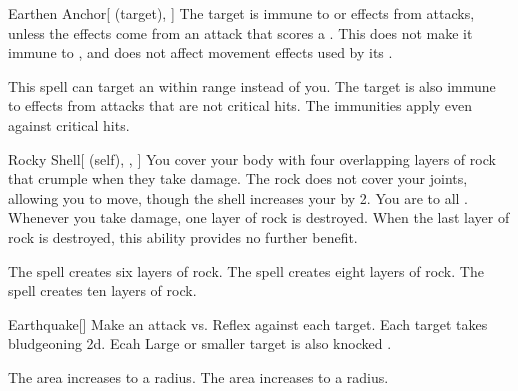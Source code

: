 \lowercase{\hypertarget{spell:Earthen Anchor}{}}\label{spell:Earthen Anchor}
\begin{attuneability}[Rank 2]{\hypertarget{spell:Earthen Anchor}{Earthen Anchor}}[ (target), ]
The target is immune to  or  effects from attacks, unless the effects come from an attack that scores a .
This does not make it immune to , and does not affect movement effects used by its .

\rankline
{} This spell can target an  within \rngmed range instead of you.
 The target is also immune to  effects from attacks that are not critical hits.
 The immunities apply even against critical hits.

\end{attuneability}
\vspace{0.25em}



\lowercase{\hypertarget{spell:Rocky Shell}{}}\label{spell:Rocky Shell}
\begin{attuneability}[Rank 2]{\hypertarget{spell:Rocky Shell}{Rocky Shell}}[ (self), , ]
You cover your body with four overlapping layers of rock that crumple when they take damage.
The rock does not cover your joints, allowing you to move, though the shell increases your  by 2.
You are  to all .
Whenever you take damage, one layer of rock is destroyed.
When the last layer of rock is destroyed, this ability provides no further benefit.

\rankline
{} The spell creates six layers of rock.
 The spell creates eight layers of rock.
 The spell creates ten layers of rock.

\end{attuneability}
\vspace{0.25em}



\lowercase{\hypertarget{spell:Earthquake}{}}\label{spell:Earthquake}
\begin{freeability}[Rank 3]{\hypertarget{spell:Earthquake}{Earthquake}}[]
Make an attack vs. Reflex against each target.
\hit Each target takes bludgeoning  \minus2d.
Ecah Large or smaller target is also knocked .

\rankline
{} The area increases to a \arealarge radius.
 The area increases to a \areahuge radius.

\end{freeability}
\vspace{0.25em}




